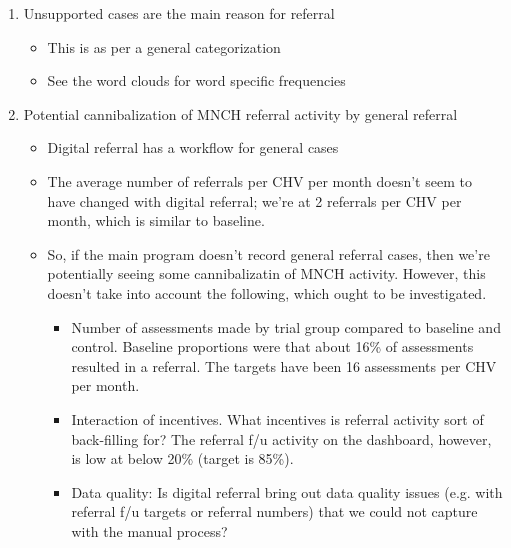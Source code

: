 \documentclass[11pt]{article}
\providecommand{\tightlist}{%
      \setlength{\itemsep}{0pt}\setlength{\parskip}{0pt}}
\begin{document}
\begin{enumerate}
\def\labelenumi{\arabic{enumi}.}
\tightlist
\item
  Unsupported cases are the main reason for referral

  \begin{itemize}
  \tightlist
  \item
    This is as per a general categorization
  \item
    See the word clouds for word specific frequencies
  \end{itemize}
\item
  Potential cannibalization of MNCH referral activity by general
  referral

  \begin{itemize}
  \tightlist
  \item
    Digital referral has a workflow for general cases
  \item
    The average number of referrals per CHV per month doesn't seem to
    have changed with digital referral; we're at 2 referrals per CHV per
    month, which is similar to baseline.
  \item
    So, if the main program doesn't record general referral cases, then
    we're potentially seeing some cannibalizatin of MNCH activity.
    However, this doesn't take into account the following, which ought
    to be investigated.

    \begin{itemize}
    \tightlist
    \item
      Number of assessments made by trial group compared to baseline and
      control. Baseline proportions were that about 16\% of assessments
      resulted in a referral. The targets have been 16 assessments per
      CHV per month.
    \item
      Interaction of incentives. What incentives is referral activity
      sort of back-filling for? The referral f/u activity on the
      dashboard, however, is low at below 20\% (target is 85\%).
    \item
      Data quality: Is digital referral bring out data quality issues
      (e.g. with referral f/u targets or referral numbers) that we could
      not capture with the manual process?
    \end{itemize}
  \end{itemize}
\end{enumerate}
\end{document}

